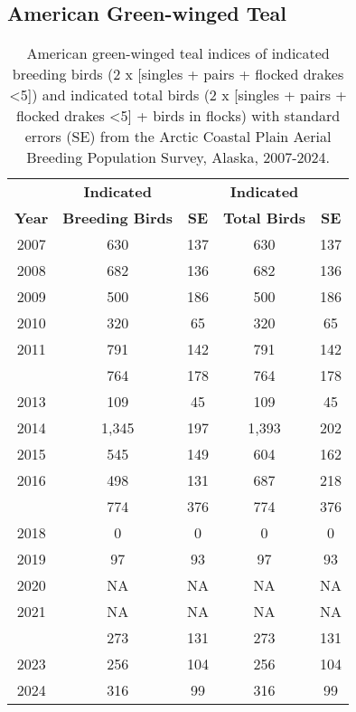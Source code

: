 \documentclass[
]{article}
\begin{document}
\subsection*{American Green-winged
Teal}\label{american-green-winged-teal-1}

\begingroup\fontsize{10}{12}\selectfont

\begin{longtable}[t]{ccccc}

\caption{\label{tbl-GWTE}American green-winged teal indices of indicated
breeding birds (2 x {[}singles + pairs + flocked drakes \textless5{]})
and indicated total birds (2 x {[}singles + pairs + flocked drakes
\textless5{]} + birds in flocks) with standard errors (SE) from the
Arctic Coastal Plain Aerial Breeding Population Survey, Alaska,
2007-2024.}

\tabularnewline

\\
\toprule
\multicolumn{1}{c}{\textbf{ }} & \multicolumn{1}{c}{\textbf{Indicated}} & \multicolumn{1}{c}{\textbf{ }} & \multicolumn{1}{c}{\textbf{Indicated}} & \multicolumn{1}{c}{\textbf{ }} \\
\cmidrule(l{3pt}r{3pt}){2-2} \cmidrule(l{3pt}r{3pt}){4-4}
\textbf{Year} & \textbf{Breeding Birds} & \textbf{SE} & \textbf{Total Birds} & \textbf{SE}\\
\midrule
2007 & 630 & 137 & 630 & 137\\
2008 & 682 & 136 & 682 & 136\\
2009 & 500 & 186 & 500 & 186\\
2010 & 320 & 65 & 320 & 65\\
2011 & 791 & 142 & 791 & 142\\
\addlinespace
2012 & 764 & 178 & 764 & 178\\
2013 & 109 & 45 & 109 & 45\\
2014 & 1,345 & 197 & 1,393 & 202\\
2015 & 545 & 149 & 604 & 162\\
2016 & 498 & 131 & 687 & 218\\
\addlinespace
2017 & 774 & 376 & 774 & 376\\
2018 & 0 & 0 & 0 & 0\\
2019 & 97 & 93 & 97 & 93\\
2020 & NA & NA & NA & NA\\
2021 & NA & NA & NA & NA\\
\addlinespace
2022 & 273 & 131 & 273 & 131\\
2023 & 256 & 104 & 256 & 104\\
2024 & 316 & 99 & 316 & 99\\
\bottomrule

\end{longtable}
\end{document}
